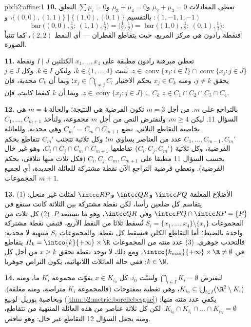 \begin{solution}{pb:b2:affine:1}
\textbf{10.} تعطي المعادلات $\mu_2 + \mu_3 = 0$ و$\mu_3 +
\mu_4 = 0$ و$\sum\mu_i = 0$ التعلق $(1, -1, 1,
-1)$:
بالتقسيم $\{(0,0), (1,1)\} \mid \{(1,0), (0,1)\}$، و
\[
\operatorname{bar}\bigl((0,0), \tfrac12;\ (1,1),
\tfrac12\bigr) = \bigl(\tfrac12, \tfrac12\bigr) =
\operatorname{bar}\bigl((1,0), \tfrac12;\ (0,1),
\tfrac12\bigr) :
\]
فنقطة رادون هي مركز المربع، حيث يتقاطع القطران --- أي النمط $(2,2)$،
كما تتنبأ الصورة.

\textbf{11.} تعطي مبرهنة رادون مطبقة على $x_1, \dots, x_4$ الكتلتين $I \mid J$
ونقطة $z \in \operatorname{conv}\{x_i : i
\in I\} \cap \operatorname{conv}\{x_j : j \in J\}$. نثبت $k
\in \{1, \dots, 4\}$، ولتكن $k \in I$. وكل $j \in J$ يحقق $j \neq k$،
ومنه $x_j \in C_k$ بحكم الاختيار $x_j \in
\bigcap_{l \neq j}C_l$؛ وبما أن $C_k$ محدبة، فإن $z \in
\operatorname{conv}\{x_j : j \in J\} \subseteq C_k$.
وبما أن $k$ كيفما كانت، فإن $z \in C_1 \cap C_2 \cap C_3 \cap C_4$.

\textbf{12.} بالتراجع على $m$. من أجل $m = 3$ تكون الفرضية هي
النتيجة؛ والحالة $m = 4$ هي السؤال 11. ليكن $m \geq 4$، ولنفترض النص من
أجل $m$ مجموعة، ولنأخذ $C_1, \dots,
C_{m+1}$ بخاصية التقاطع الثلاثي. نضع $C_m' =
C_m \cap C_{m+1}$
وهي محدبة. وللعائلة $C_1, \dots, C_{m-1},
C_m'$ عدد من العناصر يساوي $m$؛ وكل ثلاثية
تتجنب $C_m'$ تتقاطع بحكم الفرضية، وكل ثلاثية $\{C_i, C_j, C_m'\}$ تقاطعها $C_i \cap C_j \cap C_m \cap C_{m+1}$،
وهو غير خال بحسب السؤال 11 مطبقا على $C_i, C_j, C_m, C_{m+1}$ (فكل ثلاث منها تتلاقى،
بحكم الفرضية). وتعطي فرضية التراجع الآن نقطة مشتركة للعائلة الجديدة،
أي لجميع المجموعات $m+1$.

\textbf{13.} (1) الأضلاع المغلقة $\intcc PQ$ و$\intcc QR$ و$\intcc RP$ لمثلث غير
منحل: يتقاسم كل ضلعين رأسا، لكن نقطة مشتركة بين الثلاثة كانت ستقع
في $\intcc
PQ \cap \intcc RP = \{P\}$ وفي $\intcc QR$، وهو ما يستبعد $P$. (2) كل ثلاث من
المجموعات $S_i = \{x_1, \dots, x_4\}
\setminus \{x_i\}$ تُسقط ثلاثا من النقط الأربع، فتبقي نقطة مشتركة
واحدة بالضبط؛ أما التقاطع الكلي فيسقط كل نقطة. والمجموعات $S_i$
منتهية لا محدبة: فالتحدب جوهري. (3) عدد منته من المجموعات $H_k = \intco{k}{+\infty} \times
\R$
يتقاطع في $\intco{k_{\max}}{+\infty} \times \R \neq
\emptyset$، ومع ذلك لا توجد نقطة تحقق $x \geq k$ من أجل كل $k \in \N$:
ففي حالة العائلات اللانهائية، يكون التراص جوهريا.

\textbf{14.} لنفترض $\bigcap_{i \in I}K_i = \emptyset$ ولنثبّت $i_0$. كل $x \in K_{i_0}$ يفوّت مجموعة
$K_i$ ما، ومنه $K_{i_0} \subseteq \bigcup_{i \in I}(\R^2 \setminus K_i)$، وهي تغطية بمفتوحات (فالمجموعة $K_i$ متراصة،
ومنه مغلقة). وبخاصية بوريل--لوبيغ (\cref{thm:b2:metric:borellebesgue}) يكفي عدد منته منها:
$K_{i_0} \cap K_{i_1} \cap \dots \cap K_{i_N} =
\emptyset$. لكن كل ثلاثة عناصر من هذه العائلة المنتهية من  تتقاطع، ومنه يجعل السؤال 12 التقاطع غير خال: وهو تناقض.


\end{solution}
